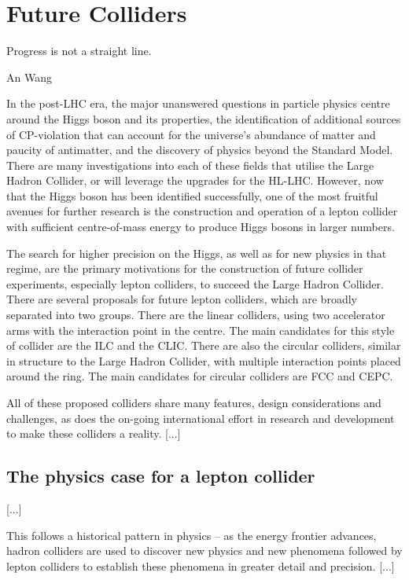 \chapter{Future Colliders}
\label{chapter:colliders}

\epigraph{Progress is not a straight line.}{An Wang}

In the post-LHC era, the major unanswered questions in particle physics centre around the Higgs boson and its properties, the identification of additional sources of CP-violation that can account for the universe's abundance of matter and paucity of antimatter, and the discovery of physics beyond the Standard Model. There are many investigations into each of these fields that utilise the Large Hadron Collider, or will leverage the upgrades for the \acrfull{HL-LHC}. However, now that the Higgs boson has been identified successfully, one of the most fruitful avenues for further research is the construction and operation of a lepton collider with sufficient centre-of-mass energy to produce Higgs bosons in larger numbers.

The search for higher precision on the Higgs, as well as for new physics in that regime, are the primary motivations for the construction of future collider experiments, especially lepton colliders, to succeed the Large Hadron Collider. There are several proposals for future lepton colliders, which are broadly separated into two groups. There are the linear colliders, using two accelerator arms with the interaction point in the centre. The main candidates for this style of collider are the \acrfull{ILC} and the \acrfull{CLIC}. There are also the circular colliders, similar in structure to the Large Hadron Collider, with multiple interaction points placed around the ring. The main candidates for circular colliders are \acrfull{FCC} and \acrfull{CEPC}. 

All of these proposed colliders share many features, design considerations and challenges, as does the on-going international effort in research and development to make these colliders a reality. [...]

\section{The physics case for a lepton collider}
[...]

This follows a historical pattern in physics -- as the energy frontier advances, hadron colliders are used to discover new physics and new phenomena followed by lepton colliders to establish these phenomena in greater detail and precision. [...]

